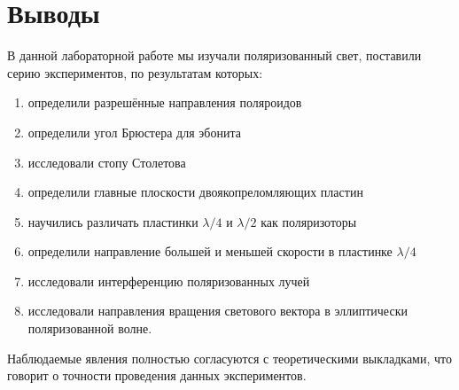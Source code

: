 \documentclass[a4paper,12pt]{article}
\begin{document}
\section{Выводы}
В данной лабораторной работе мы изучали поляризованный свет, поставили серию экспериментов, по результатам которых:
\begin{enumerate}
    \item определили разрешённые направления поляроидов
    \item определили угол Брюстера для эбонита
    \item исследовали стопу Столетова
    \item определили главные плоскости двоякопреломляющих пластин
    \item научились различать пластинки $\lambda/4$ и $\lambda/2$ как поляризоторы
    \item определили направление большей и меньшей скорости в пластинке $\lambda/4$
    \item исследовали интерференцию поляризованных лучей
    \item исследовали направления вращения светового вектора в эллиптически поляризованной волне.
\end{enumerate}

Наблюдаемые явления полностью согласуются с теоретическими выкладками, что говорит о точности проведения данных экспериментов.
\end{document}
